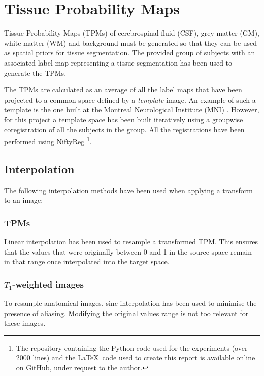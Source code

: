 \section{Tissue Probability Maps}



Tissue Probability Maps (TPMs) of cerebrospinal fluid (CSF), grey matter (GM), white matter (WM) and background must be generated so that they can be used as spatial priors for tissue segmentation. The provided group of subjects with an associated label map representing a tissue segmentation has been used to generate the TPMs.


The TPMs are calculated as an average of all the label maps that have been projected to a common space defined by a \textit{template} image. An example of such a template is the one built at the Montreal Neurological Institute (MNI) \cite{evans_3d_1993}. However, for this project a template space has been built iteratively using a groupwise coregistration of all the subjects in the group. All the registrations have been performed using NiftyReg \cite{modat_global_2014}\footnote{The repository containing the Python code used for the experiments (over 2000 lines) and the \LaTeX\ code used to create this report is available online on GitHub, under request to the author.}.


\subsection{Interpolation}
The following interpolation methods have been used when applying a transform to an image:

\subsubsection{TPMs}
Linear interpolation has been used to resample a transformed TPM. This ensures that the values that were originally between 0 and 1 in the source space remain in that range once interpolated into the target space.

\subsubsection{$T_1$-weighted images} To resample anatomical images, sinc interpolation has been used to minimise the presence of aliasing. Modifying the original values range is not too relevant for these images.

